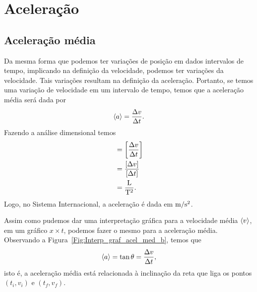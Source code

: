 \section{Aceleração}

\subsection{Aceleração média}

Da mesma forma que podemos ter variações de posição em dados intervalos de tempo, implicando na definição da velocidade, podemos ter variações da velocidade. Tais variações resultam na definição da aceleração. Portanto, se temos uma variação de velocidade em um intervalo de tempo, temos que a aceleração média será dada por
\begin{equation}
  \left\langle{a}\right\rangle = \frac{\Delta v}{\Delta t}.
\end{equation}
%
Fazendo a análise dimensional temos
\begin{align}
	[\mean{a}] &= \left[\frac{\Delta v}{\Delta t}\right] \\
		&= \frac{[\Delta v]}{[\Delta t]} \\
		&= \frac{\rm{L}}{\rm{T}^2}.
\end{align}
%
Logo, no Sistema Internacional, a aceleração é dada em $\rm{m}/\rm{s}^2$.

Assim como pudemos dar uma interpretação gráfica para a velocidade média $\left\langle{v}\right\rangle$, em um gráfico $x \times t$, podemos fazer o mesmo para a aceleração média. Observando a Figura~\ref{Fig:Interp_graf_acel_med_b}, temos que
\begin{equation}
	\left\langle{a}\right\rangle = \tan \theta = \frac{\Delta v}{\Delta t},
\end{equation}
%
isto é, a aceleração média está relacionada à inclinação da reta que liga os pontos $(t_i, v_i)$ e $(t_f, v_f)$.

